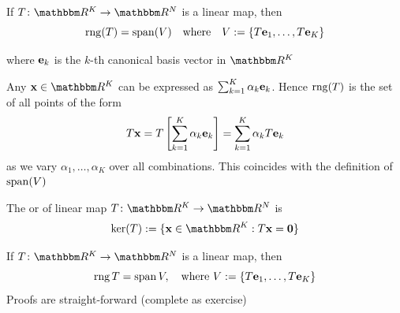 \begin{frame}

    \vspace{2em}
    \Fact{\eqref{ET-fa:res}}
    If $T \colon \RR^K \to \RR^N$ is a linear map, then 
    \begin{equation*}
        \operatorname{rng}(T) = \operatorname{span}(V) 
        \quad \text{where} \quad
        V := \{T{\mathbf e}_1, \ldots, T{\mathbf e}_K\}
    \end{equation*}


    where ${\mathbf e}_k$ is the $k$-th canonical basis vector in $\RR^K$
    \vspace{1em}

    \Prf Any $\boldx \in \RR^K$ can be expressed as $\sum_{k=1}^K \alpha_k {\mathbf e}_k$. 
    Hence $\operatorname{rng}(T)$ is the set of all points of the form
    \begin{equation*}
        T{\mathbf x}
        = T \left[ \sum_{k=1}^K \alpha_k {\mathbf e}_k \right]
        = \sum_{k=1}^K \alpha_k T {\mathbf e}_k 
    \end{equation*}
    as we vary $\alpha_1, \ldots, \alpha_K$ over all combinations.
    This coincides with the definition of $\operatorname{span}(V)$

\end{frame}

\begin{frame}
    
    \vspace{2em}
    The  or  of linear map $T \colon \RR^K \to
    \RR^N$ is
    \begin{equation*}
        \kernel(T) := \setntn{\boldx \in \RR^K}{T\boldx = \boldzero}
    \end{equation*}

    \vspace{.7em}
    \Fact{\eqref{ET-fa:res}}
    If $T \colon \RR^K \to \RR^N$ is a linear map, then 
    \begin{equation*}
        \operatorname{rng} T = \operatorname{span} V,
        \quad \text{where } 
        V := \{T{\mathbf e}_1, \ldots, T{\mathbf e}_K\}
    \end{equation*}
    Proofs are straight-forward (complete as exercise)
    
\end{frame}

